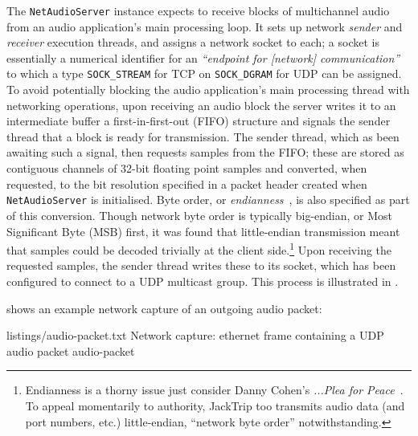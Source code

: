 The \texttt{NetAudioServer} instance expects to receive blocks of
multichannel audio from an audio application's main processing loop.
It sets up network \textit{sender} and \textit{receiver} execution threads, and
assigns a network socket to each; a socket is essentially a numerical identifier
for an
\textit{``endpoint for [network] communication''}~\citep{kerrisk_socket2_2023}
to which a type \textemdash{} \texttt{SOCK\_STREAM} for TCP on
\texttt{SOCK\_DGRAM} for UDP \textemdash{} can be assigned.
To avoid potentially blocking the audio application's main processing thread
with networking operations, upon receiving an audio block the server writes it
to an intermediate buffer \textemdash{} a first-in-first-out (FIFO) structure
\textemdash{} and signals the sender thread that a block is ready for
transmission.
The sender thread, which as been awaiting such a signal, then requests samples
from the FIFO; these are stored as contiguous channels of 32-bit floating point
samples and converted, when requested, to the bit resolution specified in a
packet header created when \texttt{NetAudioServer} is initialised.
Byte order, or \textit{endianness}~\citep{cohen_holy_1981}, is also specified as
part of this conversion.
Though network byte order is typically big-endian, or Most Significant Byte
(MSB) first, it was found that little-endian transmission meant that samples
could be decoded trivially at the client side.\footnote{
    Endianness is a thorny issue \textemdash{} just consider Danny Cohen's
    \textit{...Plea for Peace}~\citep{cohen_holy_1981}.
    To appeal momentarily to authority, JackTrip too transmits audio data (and
    port numbers, etc.) little-endian, ``network byte order'' notwithstanding.
}
Upon receiving the requested samples, the sender thread writes these to its
socket, which has been configured to connect to a UDP multicast group.
This process is illustrated in .

 shows an example network capture of an outgoing
audio packet:

{listings/audio-packet.txt}
{Network capture: ethernet frame containing a UDP audio packet}
{audio-packet}


